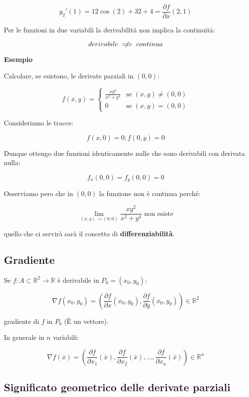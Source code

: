 \documentclass[11pt]{article}
\begin{document}
\[
    g_2'(1) = 12 \cos(2) + 32 + 4 = \frac{\partial f}{\partial x}(2,1)
\]


Per le funzioni in due variabili la derivabilità non implica la continuità:

\[
    derivabile \centernot\implies continua
\]

\textbf{Esempio} 

Calcolare, se esistono, le derivate parziali in $(0,0)$:


    \[
        f(x,y)=
     \begin{cases}
        \frac{xy^{2}}{x^{2}+y^{4}} & \text{se $(x,y)\neq (0,0)$} \\
        0 & \text{se $(x,y)=(0,0)$}
    \end{cases}
    \]

Consideriamo le tracce:

\[
    f(x,0) = 0 ; f(0,y) =0
\]

Dunque ottengo due funzioni identicamente nulle che sono derivabili con derivata nulla:

\[
    f_x(0,0) = f_y(0,0) = 0
\]

Osserviamo pero che in $(0,0)$ la funzione non è continua perché:

\[
    \lim_{ (x,y) \to (0,0) } \frac{xy^{2}}{x^{2}+y^{4}} \text{ non esiste}
\]

quello che ci servirà sarà il concetto di \textbf{differenziabilità}.

\subsection{Gradiente}

Se $f: A \subset \mathbb{R}^{2}\rightarrow \mathbb{R}$ è derivabile in $P_0=(x_0,y_0)$:

\[
    \nabla f(x_0,y_0)=(\frac{\partial f}{\partial x}(x_0,y_0), \frac{\partial f}{\partial y}(x_0,y_0)) \in \mathbb{R}^{2}
\]

gradiente di $f$ in $P_0$ (È un vettore).

In generale in $n$ variabili:

\[
    \nabla f(\bar{x} ) = (\frac{\partial f}{\partial x_1}(\bar{x} ), \frac{\partial f}{\partial x_2}(\bar{x} ),..., \frac{\partial f}{\partial x_n}(\bar{x} )) \in \mathbb{R}^{n}
\]

\subsection{Significato geometrico delle derivate parziali}
\end{document}
